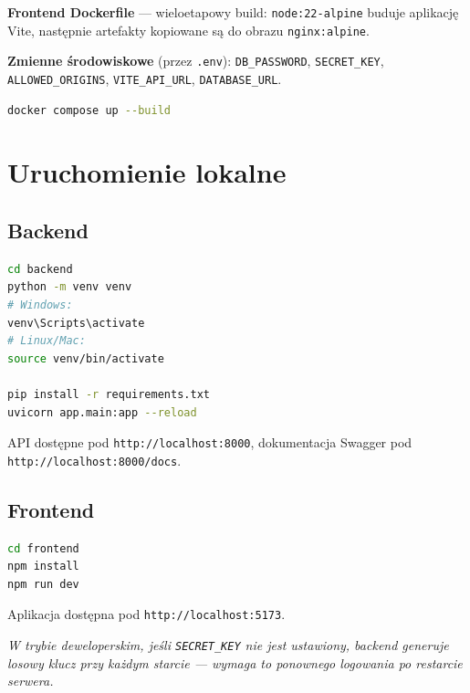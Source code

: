 \documentclass[11pt,a4paper]{article}
\begin{document}
\textbf{Frontend Dockerfile} --- wieloetapowy build: \texttt{node:22-alpine} buduje aplikację
Vite, następnie artefakty kopiowane są do obrazu \texttt{nginx:alpine}.

\textbf{Zmienne środowiskowe} (przez \texttt{.env}): \texttt{DB\_PASSWORD},
\texttt{SECRET\_KEY}, \texttt{ALLOWED\_ORIGINS}, \texttt{VITE\_API\_URL},
\texttt{DATABASE\_URL}.

\begin{lstlisting}[language=bash]
docker compose up --build
\end{lstlisting}

\section{Uruchomienie lokalne}

\subsection{Backend}
\begin{lstlisting}[language=bash]
cd backend
python -m venv venv
# Windows:
venv\Scripts\activate
# Linux/Mac:
source venv/bin/activate

pip install -r requirements.txt
uvicorn app.main:app --reload
\end{lstlisting}
API dostępne pod \texttt{http://localhost:8000}, dokumentacja Swagger pod
\texttt{http://localhost:8000/docs}.

\subsection{Frontend}
\begin{lstlisting}[language=bash]
cd frontend
npm install
npm run dev
\end{lstlisting}
Aplikacja dostępna pod \texttt{http://localhost:5173}.

\vspace{0.5cm}
\noindent\textit{W trybie deweloperskim, jeśli \texttt{SECRET\_KEY} nie jest ustawiony, backend
generuje losowy klucz przy każdym starcie --- wymaga to ponownego logowania po restarcie
serwera.}
\end{document}
